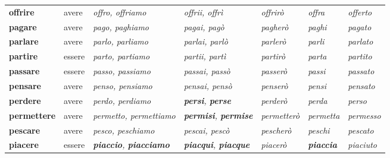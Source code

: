 \documentclass[11pt,a4paper,twoside,openright]{book}
\newcommand{\irr}[1]{{\color{exccol}\bfseries #1}}
\begin{document}
{\begin{xltabular}{\linewidth}{@{}>{\raggedright\arraybackslash}p{2.7cm} l L L l >{\raggedright\arraybackslash}p{1.9cm} l@{}}
\textbf{offrire} & avere & \textit{offro, offriamo} & \textit{offrii, offrì} & \textit{offrirò} & \textit{offra} & \textit{offerto} \\
\textbf{pagare} & avere & \textit{pago, paghiamo} & \textit{pagai, pagò} & \textit{pagherò} & \textit{paghi} & \textit{pagato} \\
\textbf{parlare} & avere & \textit{parlo, parliamo} & \textit{parlai, parlò} & \textit{parlerò} & \textit{parli} & \textit{parlato} \\
\textbf{partire} & essere & \textit{parto, partiamo} & \textit{partii, partì} & \textit{partirò} & \textit{parta} & \textit{partito} \\
\textbf{passare} & essere & \textit{passo, passiamo} & \textit{passai, passò} & \textit{passerò} & \textit{passi} & \textit{passato} \\
\textbf{pensare} & avere & \textit{penso, pensiamo} & \textit{pensai, pensò} & \textit{penserò} & \textit{pensi} & \textit{pensato} \\
\textbf{perdere} & avere & \textit{perdo, perdiamo} & \textit{\irr{persi}, \irr{perse}} & \textit{perderò} & \textit{perda} & \textit{perso} \\
\textbf{permettere} & avere & \textit{permetto, permettiamo} & \textit{\irr{permisi}, \irr{permise}} & \textit{permetterò} & \textit{permetta} & \textit{permesso} \\
\textbf{pescare} & avere & \textit{pesco, peschiamo} & \textit{pescai, pescò} & \textit{pescherò} & \textit{peschi} & \textit{pescato} \\
\textbf{piacere} & essere & \textit{\irr{piaccio}, \irr{piacciamo}} & \textit{\irr{piacqui}, \irr{piacque}} & \textit{piacerò} & \textit{\irr{piaccia}} & \textit{piaciuto} \\

\end{xltabular}}
\end{document}
